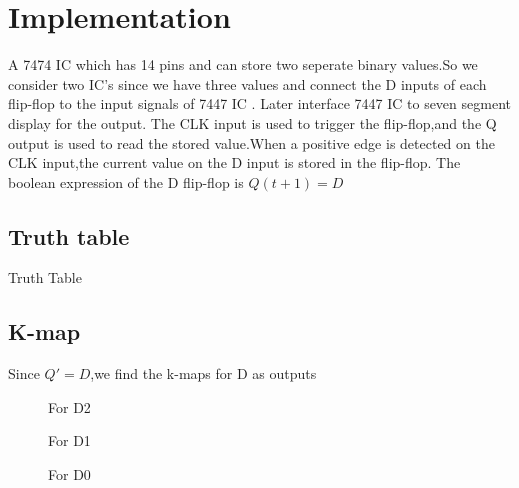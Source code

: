 \documentclass[10pt,a4paper]{article}
\begin{document}
\section{Implementation}
A 7474 IC which  has 14 pins and can store two seperate binary values.So we consider two IC's since we have three values  and connect the  D inputs of each flip-flop to the input signals of 7447 IC . Later interface 7447 IC to seven segment display for the output. The CLK input is used to trigger the flip-flop,and the Q output is used to read the stored value.When a positive edge is detected on the CLK input,the current value on the D input is stored in the flip-flop. The boolean expression of the D flip-flop is $Q(t+1) = D$
\subsection{Truth table}
\begin{table}[!h]
\centering
   
\caption{Truth Table}
\label{table:truth_table}
\end{table}
\pagebreak
\subsection{K-map}
Since $Q'= D$,we find the k-maps for D as outputs\\
\begin{figure}[!h]                                
\begin{center}                                 
\resizebox{0.5\columnwidth}{!}{

}                                                
\end{center}                                     
\caption{For D2}                                       
\label{fig:for_D2}                             
\end{figure}
%
\begin{figure}[!h]                              
\begin{center}                                 
\resizebox{0.5\columnwidth}{!}{

}                                               
\end{center}                                   
\caption{For D1}                                     
\label{fig:for_D1}                             
\end{figure}
%
\begin{figure}[!h]                             
\begin{center}                                
\resizebox{0.5\columnwidth}{!}{

}                                              
\end{center}                              
\caption{For D0}                                
\label{fig:for_D1}                            
\end{figure}    
\pagebreak
%
\end{document}
